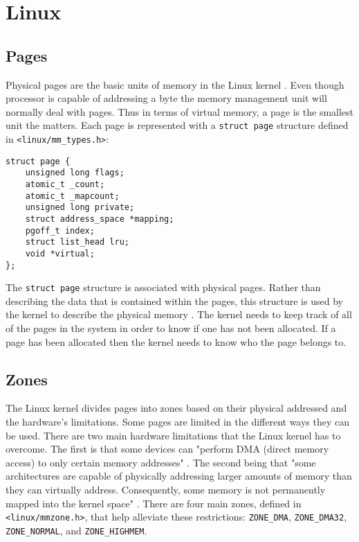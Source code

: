 \section{Linux}
\subsection{Pages}
Physical pages are the basic units of memory in the Linux kernel \cite{LinuxTextbook}. Even though processor is capable of addressing a byte the memory management unit will normally deal with pages\cite{LinuxTextbook}. Thus in terms of virtual memory, a page is the smallest unit the matters. Each page is represented with a \lstinline{struct page} structure defined in \lstinline{<linux/mm_types.h>}:
\begin{lstlisting}
struct page {
    unsigned long flags;
    atomic_t _count;
    atomic_t _mapcount;
    unsigned long private;
    struct address_space *mapping;
    pgoff_t index;
    struct list_head lru;
    void *virtual;
};
\end{lstlisting}
The \lstinline{struct page} structure is associated with physical pages. Rather than describing the data that is contained within the pages, this structure is used by the kernel to describe the physical memory \cite{LinuxTextbook}. The kernel needs to keep track of all of the pages in the system in order to know if one has not been allocated. If a page has been allocated then the kernel needs to know who the page belongs to. 
\subsection{Zones}
The Linux kernel divides pages into zones based on their physical addressed and the hardware's limitations. Some pages are limited in the different ways they can be used. There are two main hardware limitations that the Linux kernel has to overcome. The first is that some devices can "perform DMA (direct memory access) to only certain memory addresses" \cite{LinuxTextbook}. The second being that "some architectures are capable of physically addressing larger amounts of memory than they can virtually address. Consequently, some memory is not permanently mapped into the kernel space" \cite{LinuxTextbook}. There are four main zones, defined in \lstinline{<linux/mmzone.h>}, that help alleviate these restrictions: \lstinline{ZONE_DMA}, \lstinline{ZONE_DMA32}, \lstinline{ZONE_NORMAL}, and \lstinline{ZONE_HIGHMEM}.  


